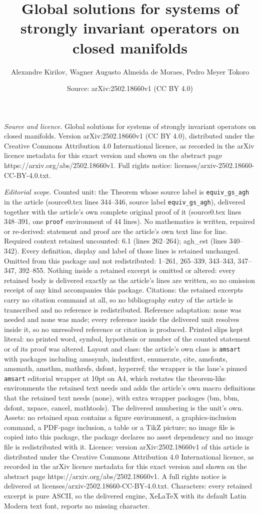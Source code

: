 \documentclass[10pt,a4paper]{amsart}
\title[Global solutions for systems of strongly invariant operators]{Global solutions for systems of strongly invariant operators on closed manifolds}
\author{Alexandre Kirilov, Wagner Augusto Almeida de Moraes, Pedro Meyer Tokoro}
\date{Source: arXiv:2502.18660v1 (CC BY 4.0)}
\begin{document}
\maketitle

\noindent\emph{Source and licence.} Global solutions for systems of strongly invariant operators on closed manifolds. Version arXiv:2502.18660v1 (CC BY 4.0), distributed under the Creative Commons Attribution 4.0 International licence, as recorded in the arXiv licence metadata for this exact version and shown on the abstract page https://arxiv.org/abs/2502.18660v1. Full rights notice: licenses/arxiv-2502.18660-CC-BY-4.0.txt.\par\smallskip

\noindent\textit{Editorial scope.} Counted unit: the Theorem whose source label is \texttt{equiv\_gs\_agh} in the article (source0.tex lines 344--346, source label \texttt{equiv\_gs\_agh}), delivered together with the article's own complete original proof of it (source0.tex lines 348--391, one \texttt{proof} environment of 44 lines). No mathematics is written, repaired or re-derived: statement and proof are the article's own text line for line. Required context retained uncounted: 6.1 (lines 262--264); agh\_est (lines 340--342). Every definition, display and label of those lines is retained unchanged. Omitted from this package and not redistributed: 1--261, 265--339, 343--343, 347--347, 392--855. Nothing inside a retained excerpt is omitted or altered: every retained body is delivered exactly as the article's lines are written, so no omission receipt of any kind accompanies this package. Citations: the retained excerpts carry no citation command at all, so no bibliography entry of the article is transcribed and no reference is redistributed. Reference adaptation: none was needed and none was made; every reference inside the delivered unit resolves inside it, so no unresolved reference or citation is produced. Printed slips kept literal: no printed word, symbol, hypothesis or number of the counted statement or of its proof was altered. Layout and class: the article's own class is \texttt{amsart} with packages including amssymb, indentfirst, enumerate, cite, amsfonts, amsmath, amsthm, mathrsfs, dsfont, hyperref; the wrapper is the lane's pinned \texttt{amsart} editorial wrapper at 10pt on A4, which restates the theorem-like environments the retained text needs and adds the article's own macro definitions that the retained text needs (none), with extra wrapper packages (bm, bbm, dsfont, xspace, cancel, mathtools). The delivered numbering is the unit's own. Assets: no retained span contains a figure environment, a graphics-inclusion command, a PDF-page inclusion, a table or a TikZ picture; no image file is copied into this package, the package declares no asset dependency and no image file is redistributed with it. Licence: version arXiv:2502.18660v1 of this article is distributed under the Creative Commons Attribution 4.0 International licence, as recorded in the arXiv licence metadata for this exact version and shown on the abstract page https://arxiv.org/abs/2502.18660v1. A full rights notice is delivered at licenses/arxiv-2502.18660-CC-BY-4.0.txt. Characters: every retained excerpt is pure ASCII, so the delivered engine, XeLaTeX with its default Latin Modern text font, reports no missing character.
\end{document}
